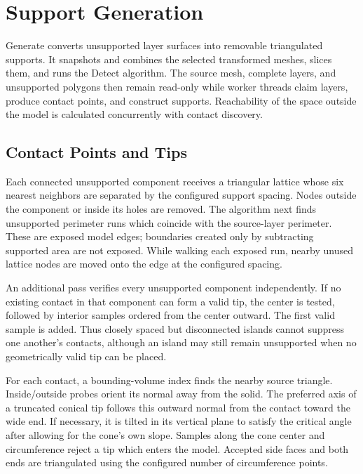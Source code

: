 
\chapter{Support Generation}
\label{chap:generate}

Generate converts unsupported layer surfaces into removable triangulated
supports. It snapshots and combines the selected transformed meshes, slices
them, and runs the Detect algorithm. The source mesh, complete layers, and
unsupported polygons then remain read-only while worker threads claim layers,
produce contact points, and construct supports. Reachability of the space
outside the model is calculated concurrently with contact discovery.

\section{Contact Points and Tips}

Each connected unsupported component receives a triangular lattice whose six
nearest neighbors are separated by the configured support spacing. Nodes
outside the component or inside its holes are removed. The algorithm next
finds unsupported perimeter runs which coincide with the source-layer
perimeter. These are exposed model edges; boundaries created only by
subtracting supported area are not exposed. While walking each exposed run,
nearby unused lattice nodes are moved onto the edge at the configured spacing.

An additional pass verifies every unsupported component independently. If no
existing contact in that component can form a valid tip, the center is tested,
followed by interior samples ordered from the center outward. The first valid
sample is added. Thus closely spaced but disconnected islands cannot suppress
one another's contacts, although an island may still remain unsupported when
no geometrically valid tip can be placed.

For each contact, a bounding-volume index finds the nearby source triangle.
Inside/outside probes orient its normal away from the solid. The preferred
axis of a truncated conical tip follows this outward normal from the contact
toward the wide end. If necessary, it is tilted in its vertical plane to
satisfy the critical angle after allowing for the cone's own slope. Samples
along the cone center and circumference reject a tip which enters the model.
Accepted side faces and both ends are triangulated using the configured number
of circumference points.

